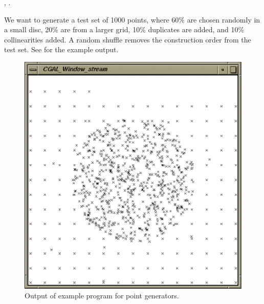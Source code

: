 \ccSeeAlso

, .

\ccExample

We want to generate a test set of 1000 points, where 60\% are chosen
randomly in a small disc, 20\% are from a larger grid, 10\% duplicates
are added, and 10\% collinearities added. A random shuffle removes the
construction order from the test set. See  for the example output.


\begin{ccTexOnly}
  \begin{figure}
    \noindent
    \hspace*{0.025\textwidth}%
    \begin{minipage}{0.45\textwidth}%
      \includegraphics[width=\textwidth]{generators_prog1.ps}
      \caption{Output of example program for point generators.}
      \label{figurePointGenerator}
    \end{minipage}%
    \hspace*{0.05\textwidth}%
    \begin{minipage}{0.45\textwidth}%

\end{minipage}
\end{figure}
\end{ccTexOnly}
